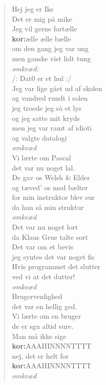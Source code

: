 \documentclass[a4paper,11pt]{article}
\begin{document}
\begin{verse}

Hej jeg er Ike\\
Det er mig på mike\\
Jeg vil gerne fortælle\\
{\bf kor:}\/ælle ælle bælle\\
om den gang jeg var ung\\
men ganske vist lidt tung\\
\medskip
{\em omkvæd:}\\
/: Dat0 er et hul :/\\
\bigskip
Jeg var lige gået ud af skolen\\
og vandred rundt i solen\\
jeg troede jeg så et lys\\
og jeg satte mit kryds\\
men jeg var ramt af idioti\\
og valgte datalogi\\
\medskip
{\em omkvæd}\\
\bigskip
Vi lærte om Pascal\\
det var nu noget lal.\\
De gav os Welsh \& Elder\\
og tæved' os med bælter\\
for min instruktor blev sur\\
da han så min struktur\\
\medskip
{\em omkvæd}\\
\bigskip
Det var nu noget lort\\
da Klaus Grue talte sort\\
Det var om et bevis\\
jeg syntes det var noget fis\\
Hvis programmet det slutter\\
ved vi at det dutter!\\
\medskip
{\em omkvæd}\\
\bigskip
Brugervenlighed\\
det var en hellig ged.\\
Vi lærte om en bruger\\
de er sgu altid sure.\\
Man må ikke sige\\
{\bf kor:}\/AAAIIINNNNTTTT\\
nej, det er helt for\\
{\bf kor:}\/AAAIIINNNNTTTT\\
\medskip
{\em omkvæd}\\

\end{verse}
\end{document}
